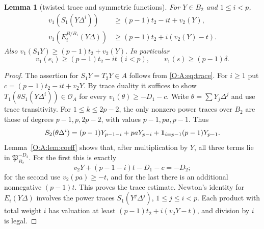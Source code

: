 \documentclass[11pt]{amsart}
\newtheorem{lemma}[theorem]{Lemma}
\theoremstyle{definition}
\theoremstyle{remark}
\newcommand{\OO}{\mathcal O}\newcommand{\pp}{\mathfrak p}\newcommand{\PP}{\mathfrak P}
\begin{document}
\begin{lemma}[twisted trace and symmetric functions]\label{O:A:lem:twisted}
For $Y\in B_2$ and $1\le i<p$,
\begin{align}
 v_1(S_1(Y\Delta^i))&\ge(p-1)t_2-it+v_2(Y),\label{O:A:eq:twtrace}\\
 v_1(E_i^{B/B_1}(Y\Delta))&\ge(p-1)t_2+i(v_2(Y)-t).
 \label{O:A:eq:twsym}
\end{align}
Also $v_1(S_1Y)\ge(p-1)t_2+v_2(Y)$.
In particular
\begin{equation}
 v_1(e_i)\ge(p-1)t_2-it\ (i<p),\qquad
 v_1(s)\ge(p-1)\delta.\label{O:A:eq:ei}
\end{equation}
\end{lemma}
\begin{proof}
The assertion for $S_1Y=T_2Y\in A$ follows from \eqref{O:A:eq:trace}.
For $i\ge1$ put $c=(p-1)t_2-it+v_2Y$.
By trace duality it suffices to show $T_1(\theta S_1(Y\Delta^i))\in\OO_A$
for every $v_1(\theta)\ge-D_1-c$.
Write $\theta=\sum Y_j\Delta^j$ and use trace transitivity.
For $1\le k\le2p-2$, the only nonzero power traces over $B_2$ are
those of degrees $p-1,p,2p-2$, with values $p-1,pa,p-1$.
Thus
\[
 S_2(\theta\Delta^i)=(p-1)Y_{p-1-i}+paY_{p-i}
       +\mathbf1_{i=p-1}(p-1)Y_{p-1}.
\]
Lemma~\ref{O:A:lem:coeff} shows that, after multiplication by $Y$, all three
terms lie in $\PP_{B_2}^{-D_2}$.  For the first this is exactly
\[
 v_2Y+(p-1-i)t-D_1-c=-D_2;
\]
for the second use $v_2(pa)\ge-t$, and for the last there is an additional
nonnegative $(p-1)t$.  This proves the trace estimate.
Newton's identity for $E_i(Y\Delta)$ involves the power traces
$S_1(Y^j\Delta^j)$, $1\le j\le i<p$.  Each product with total weight $i$
has valuation at least $(p-1)t_2+i(v_2Y-t)$, and division by $i$ is legal.
\end{proof}
\end{document}
